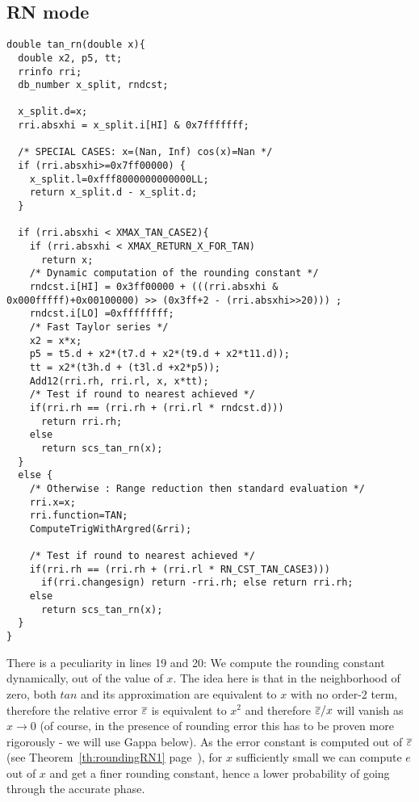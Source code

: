 \subsection{RN mode}
\begin{lstlisting}[caption={Exceptional cases for tangent RN},firstnumber=1]
double tan_rn(double x){  
  double x2, p5, tt;
  rrinfo rri;
  db_number x_split, rndcst;

  x_split.d=x;
  rri.absxhi = x_split.i[HI] & 0x7fffffff;

  /* SPECIAL CASES: x=(Nan, Inf) cos(x)=Nan */
  if (rri.absxhi>=0x7ff00000) {
    x_split.l=0xfff8000000000000LL;
    return x_split.d - x_split.d; 
  }   

  if (rri.absxhi < XMAX_TAN_CASE2){ 
    if (rri.absxhi < XMAX_RETURN_X_FOR_TAN) 
      return x;
    /* Dynamic computation of the rounding constant */
    rndcst.i[HI] = 0x3ff00000 + (((rri.absxhi & 0x000fffff)+0x00100000) >> (0x3ff+2 - (rri.absxhi>>20))) ;
    rndcst.i[LO] =0xffffffff;
    /* Fast Taylor series */
    x2 = x*x;
    p5 = t5.d + x2*(t7.d + x2*(t9.d + x2*t11.d));
    tt = x2*(t3h.d + (t3l.d +x2*p5));
    Add12(rri.rh, rri.rl, x, x*tt);  
    /* Test if round to nearest achieved */ 
    if(rri.rh == (rri.rh + (rri.rl * rndcst.d)))
      return rri.rh;
    else
      return scs_tan_rn(x); 
  }
  else {
    /* Otherwise : Range reduction then standard evaluation */
    rri.x=x;
    rri.function=TAN;
    ComputeTrigWithArgred(&rri);

    /* Test if round to nearest achieved */ 
    if(rri.rh == (rri.rh + (rri.rl * RN_CST_TAN_CASE3)))
      if(rri.changesign) return -rri.rh; else return rri.rh;
    else
      return scs_tan_rn(x); 
  }    
}
\end{lstlisting}

There is a peculiarity in lines 19 and 20: We compute the rounding
constant dynamically, out of the value of $x$. The idea here is that
in the neighborhood of zero, both $tan$ and its approximation are
equivalent to $x$ with no order-2 term, therefore the relative error
${\overline{\varepsilon}}$ is equivalent to $x^2$ and therefore ${\overline{\varepsilon}}/x$ will vanish
as $x\rightarrow 0$ (of course, in the presence of rounding error this
has to be proven more rigorously - we will use Gappa below).  As the
error constant is computed out of ${\overline{\varepsilon}}$ (see
Theorem~\ref{th:roundingRN1} page~\pageref{th:roundingRN1}), for $x$
sufficiently small we can compute $e$ out of $x$ and get a finer
rounding constant, hence a lower probability of going through the
accurate phase.


